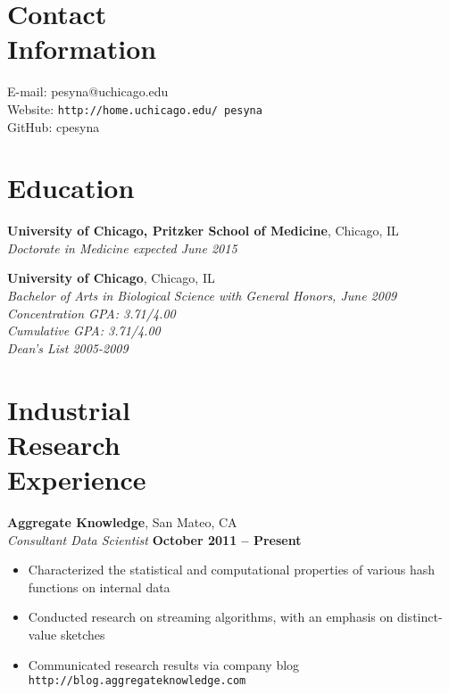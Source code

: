 \documentclass[margin,line]{resume}
\begin{document}
\begin{resume}

    \section{\mysidestyle Contact\\Information}

    E-mail: pesyna@uchicago.edu\\
    Website: \texttt{http://home.uchicago.edu/~pesyna}\\
    GitHub: cpesyna \vspace{0mm}

    \section{\mysidestyle Education}
    \textbf{University of Chicago, Pritzker School of Medicine}, Chicago, IL\\%
    \textsl{Doctorate in Medicine expected June 2015}

    \textbf{University of Chicago}, Chicago, IL\\%
    \textsl{Bachelor of Arts in Biological Science with General Honors, June 2009}\\%
    \textsl{Concentration GPA: 3.71/4.00} \\
    \textsl{Cumulative GPA: 3.71/4.00} \\
    \textsl{Dean's List 2005-2009}
    \section{\mysidestyle Industrial\\Research\\Experience}
    \textbf{Aggregate Knowledge}, San Mateo, CA\\\vspace{1mm}
    \textsl{Consultant Data Scientist} \hfill \textbf{October 2011 -- Present}
    \begin{itemize}
    \item Characterized the statistical and computational properties of various hash functions on internal data
    \item Conducted research on streaming algorithms, with an emphasis on distinct-value sketches
    \item Communicated research results via company blog \texttt{http://blog.aggregateknowledge.com}
    \end{itemize}


\end{resume}
\end{document}
